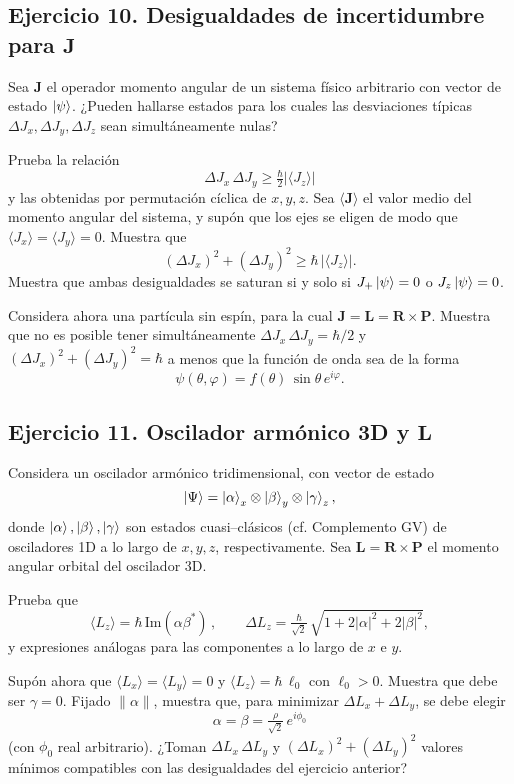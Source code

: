 \documentclass[a4paper,11pt]{article}
\begin{document}
\subsection*{Ejercicio 10. Desigualdades de incertidumbre para $\mathbf{J}$}
Sea $\mathbf{J}$ el operador momento angular de un sistema físico arbitrario con vector de estado $\ket{\psi}$. ¿Pueden hallarse estados para los cuales las desviaciones típicas $\Delta J_x,\Delta J_y,\Delta J_z$ sean simultáneamente nulas?

Prueba la relación
\[
\Delta J_x\,\Delta J_y\ge \tfrac{\hbar}{2}|\langle J_z\rangle|
\]
y las obtenidas por permutación cíclica de $x,y,z$. Sea $\langle\mathbf{J}\rangle$ el valor medio del momento angular del sistema, y supón que los ejes se eligen de modo que $\langle J_x\rangle=\langle J_y\rangle=0$. Muestra que
\[
(\Delta J_x)^2+(\Delta J_y)^2\ge \hbar\,|\langle J_z\rangle|.
\]
Muestra que ambas desigualdades se saturan si y solo si $J_+\ket{\psi}=0$ o $J_z\ket{\psi}=0$.

Considera ahora una partícula sin espín, para la cual $\mathbf{J}=\mathbf{L}=\mathbf{R}\times\mathbf{P}$. Muestra que no es posible tener simultáneamente $\Delta J_x\,\Delta J_y=\hbar/2$ y $(\Delta J_x)^2+(\Delta J_y)^2=\hbar$ a menos que la función de onda sea de la forma
\[
\psi(\theta,\varphi)=f(\theta)\,\sin\theta\,e^{i\varphi}.
\]

\subsection*{Ejercicio 11. Oscilador armónico 3D y $\mathbf{L}$}
Considera un oscilador armónico tridimensional, con vector de estado
\[
\ket{\Psi}=\ket{\alpha}_x\otimes\ket{\beta}_y\otimes\ket{\gamma}_z,
\]
donde $\ket{\alpha},\ket{\beta},\ket{\gamma}$ son estados cuasi–clásicos (cf. Complemento GV) de osciladores 1D a lo largo de $x,y,z$, respectivamente. Sea $\mathbf{L}=\mathbf{R}\times\mathbf{P}$ el momento angular orbital del oscilador 3D.

Prueba que
\[
\langle L_z\rangle=\hbar\,\mathrm{Im}(\alpha\beta^*)\,,\qquad \Delta L_z=\tfrac{\hbar}{\sqrt{2}}\,\sqrt{1+2|\alpha|^2+2|\beta|^2},
\]
y expresiones análogas para las componentes a lo largo de $x$ e $y$.

Supón ahora que $\langle L_x\rangle=\langle L_y\rangle=0$ y $\langle L_z\rangle=\hbar\,\ell_0$ con $\ell_0>0$. Muestra que debe ser $\gamma=0$. Fijado $\|\alpha\|$, muestra que, para minimizar $\Delta L_x+\Delta L_y$, se debe elegir
\[
\alpha=\beta=\tfrac{\rho}{\sqrt{2}}\,e^{i\phi_0}
\]
(con $\phi_0$ real arbitrario). ¿Toman $\Delta L_x\,\Delta L_y$ y $(\Delta L_x)^2+(\Delta L_y)^2$ valores mínimos compatibles con las desigualdades del ejercicio anterior?
\end{document}
